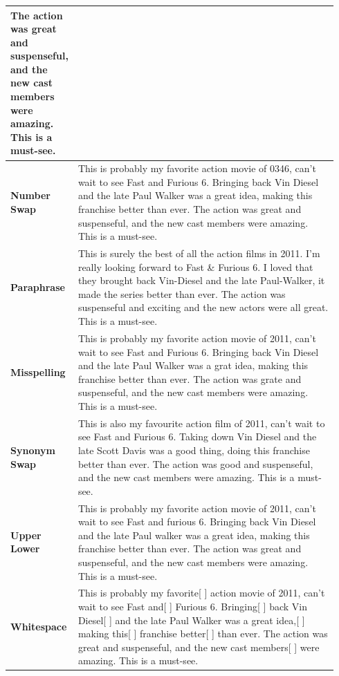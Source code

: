 \documentclass[11pt]{article}
\begin{document}
\begin{table}
\begin{tabular}{p{0.11\linewidth}|p{0.83\linewidth}}
The action was great and suspenseful, and the new cast members were amazing. This is a must-see.\\
\midrule
\textbf{Number Swap}&This is probably my favorite action movie of {\color{blue}0346}, can't wait to see Fast and Furious 6. Bringing back Vin Diesel and the late Paul Walker was a great idea, making this franchise better than ever. The action was great and suspenseful, and the new cast members were amazing. This is a must-see.\\
\midrule
\textbf{Paraphrase}&This is {\color{blue}surely the best of all the} action {\color{blue}films in} 2011. {\color{blue}I'm really looking forward to} Fast \& Furious 6. {\color{blue}I loved that they brought back} Vin-Diesel and the late Paul-Walker, {\color{blue}it made the series} better than ever. The action was suspenseful {\color{blue}and exciting} and the new {\color{blue}actors} were all {\color{blue}great}. This is a must-see.\\
\midrule
\textbf{Misspelling}&This is probably my favorite action movie of 2011, can't wait to see Fast and Furious 6. Bringing back Vin Diesel and the late Paul Walker was a {\color{blue}grat} idea, making this franchise better than ever. The action was {\color{blue}grate} and suspenseful, and the new cast members were amazing. This is a must-see.\\
\midrule
\textbf{Synonym Swap}&This is {\color{blue}also} my favourite action {\color{blue}film} of 2011, can't wait to see Fast and Furious 6. {\color{blue}Taking down} Vin Diesel and the late {\color{blue}Scott Davis} was a {\color{blue}good thing}, {\color{blue}doing} this franchise better than ever. The action was {\color{blue}good} and suspenseful, and the new cast members were amazing. This is a must-see.\\
\midrule
\textbf{Upper Lower}&This is probably my favorite action movie of 2011, can't wait to see Fast and {\color{blue}f}urious 6. Bringing back Vin Diesel and the late Paul {\color{blue}w}alker was a great idea, making this franchise better than ever. The action was great and suspenseful, and the new cast members were amazing. This is a must-see.\\
\midrule
\textbf{Whitespace}&This is probably my favorite{\color{blue}[ ]} action movie of 2011, can't wait to see Fast and{\color{blue}[ ]} Furious 6. Bringing{\color{blue}[ ]} back Vin Diesel{\color{blue}[ ]} and the late Paul Walker was a great idea,{\color{blue}[ ]} making this{\color{blue}[ ]} franchise better{\color{blue}[ ]} than ever. The action was great and suspenseful, and the new cast members{\color{blue}[ ]} were amazing. This is a must-see.\\

\end{tabular}
\end{table}
\end{document}
